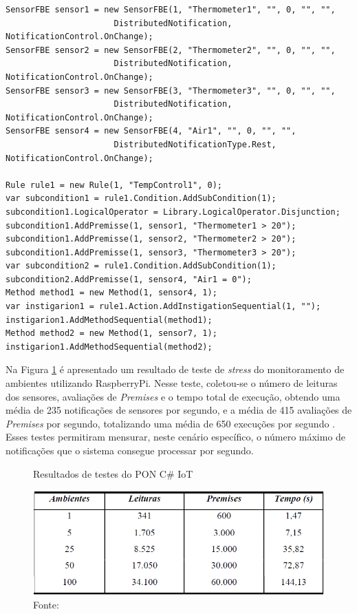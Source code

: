 \begin{lstlisting}[caption = {Exemplo de \textit{Rule} com o \textit{Framework} PON C\# IoT},
  source = {Adaptado de \citeonline{msc_oliveira_2019}}, float=htb,
  label = {cod:rule_iot}]
SensorFBE sensor1 = new SensorFBE(1, "Thermometer1", "", 0, "", "", 
                      DistributedNotification, NotificationControl.OnChange);
SensorFBE sensor2 = new SensorFBE(2, "Thermometer2", "", 0, "", "",
                      DistributedNotification, NotificationControl.OnChange);
SensorFBE sensor3 = new SensorFBE(3, "Thermometer3", "", 0, "", "", 
                      DistributedNotification, NotificationControl.OnChange);
SensorFBE sensor4 = new SensorFBE(4, "Air1", "", 0, "", "", 
                      DistributedNotificationType.Rest, NotificationControl.OnChange);

Rule rule1 = new Rule(1, "TempControl1", 0);
var subcondition1 = rule1.Condition.AddSubCondition(1);
subcondition1.LogicalOperator = Library.LogicalOperator.Disjunction;
subcondition1.AddPremisse(1, sensor1, "Thermometer1 > 20");
subcondition1.AddPremisse(1, sensor2, "Thermometer2 > 20");
subcondition1.AddPremisse(1, sensor3, "Thermometer3 > 20");
var subcondition2 = rule1.Condition.AddSubCondition(1);
subcondition2.AddPremisse(1, sensor4, "Air1 = 0");
Method method1 = new Method(1, sensor4, 1);
var instigarion1 = rule1.Action.AddInstigationSequential(1, "");
instigarion1.AddMethodSequential(method1);
Method method2 = new Method(1, sensor7, 1);
instigarion1.AddMethodSequential(method2);
\end{lstlisting}

Na Figura \ref{fig:teste_pon_iot} é apresentado um resultado de teste de
\textit{stress} do monitoramento de ambientes utilizando RaspberryPi. Nesse
teste, coletou-se o número de leituras dos sensores, avaliações de
\textit{Premises} e o tempo total de execução, obtendo uma média de 235
notificações de sensores por segundo, e a média de 415 avaliações de
\textit{Premises} por segundo, totalizando uma média de 650 execuções por
segundo . Esses testes permitiram mensurar, neste
cenário específico, o número máximo de notificações que o sistema consegue
processar por segundo.

\begin{figure}[!htb]
  \centering
  \caption{Resultados de testes do PON C\# IoT}
  \includegraphics[width=.75\textwidth]{../figures/teste_pon_iot.png}
  \caption*{Fonte: }
  \label{fig:teste_pon_iot}
\end{figure}

